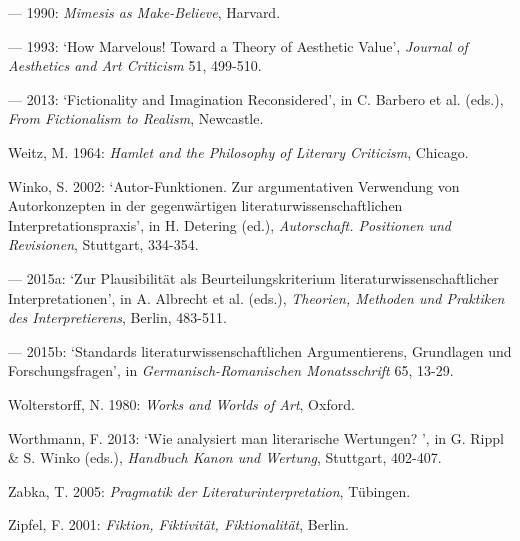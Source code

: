 \begin{hangparas}{.5cm}{1}
--- 1990: \emph{Mimesis as Make-Believe}, Harvard.

--- 1993: `How Marvelous! Toward a Theory of Aesthetic Value', \emph{Journal of Aesthetics and Art Criticism} 51, 499-510.

--- 2013: `Fictionality and Imagination Reconsidered', in C. Barbero et al. (eds.), \emph{From Fictionalism to Realism}, Newcastle.

Weitz, M. 1964: \emph{Hamlet and the Philosophy of Literary Criticism}, Chicago.

Winko, S. 2002: `Autor-Funktionen. Zur argumentativen Verwendung von Autorkonzepten in der gegenw\"artigen literaturwissenschaftlichen Interpretationspraxis', in H. Detering (ed.), \emph{Autorschaft. Positionen und Revisionen}, Stuttgart, 334-354.

--- 2015a: `Zur Plausibilit\"at als Beurteilungskriterium literaturwissenschaftlicher Interpretationen', in A. Albrecht et al. (eds.), \emph{Theorien, Methoden und Praktiken des Interpretierens}, Berlin, 483-511.

--- 2015b: `Standards literaturwissenschaftlichen Argumentierens, Grundlagen und Forschungsfragen', in \emph{Germanisch-Romanischen Monatsschrift} 65, 13-29.

Wolterstorff, N. 1980: \emph{Works and Worlds of Art}, Oxford.

Worthmann, F. 2013: `Wie analysiert man literarische Wertungen? ', in G. Rippl \& S. Winko (eds.), \emph{Handbuch Kanon und Wertung}, Stuttgart, 402-407.

Zabka, T. 2005: \emph{Pragmatik der Literaturinterpretation}, T\"ubingen.

Zipfel, F. 2001: \emph{Fiktion, Fiktivit\"at, Fiktionalit\"at}, Berlin.

\end{hangparas}
